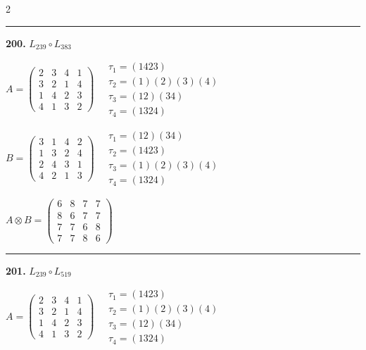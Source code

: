 \begin{multicols}{2}
\vspace{0.3em}
\hrule
\vspace{0.3em}

\noindent\textbf{200.} $L_{239} \circ L_{383}$

$A = \begin{pmatrix} 2 & 3 & 4 & 1 \\ 3 & 2 & 1 & 4 \\ 1 & 4 & 2 & 3 \\ 4 & 1 & 3 & 2 \end{pmatrix} \quad \begin{matrix} \tau_{1}=(1 4 2 3) \\ \tau_{2}=(1)(2)(3)(4) \\ \tau_{3}=(1 2)(3 4) \\ \tau_{4}=(1 3 2 4) \end{matrix}$

$B = \begin{pmatrix} 3 & 1 & 4 & 2 \\ 1 & 3 & 2 & 4 \\ 2 & 4 & 3 & 1 \\ 4 & 2 & 1 & 3 \end{pmatrix} \quad \begin{matrix} \tau_{1}=(1 2)(3 4) \\ \tau_{2}=(1 4 2 3) \\ \tau_{3}=(1)(2)(3)(4) \\ \tau_{4}=(1 3 2 4) \end{matrix}$

$A \otimes B = \begin{pmatrix} 6 & 8 & 7 & 7 \\ 8 & 6 & 7 & 7 \\ 7 & 7 & 6 & 8 \\ 7 & 7 & 8 & 6 \end{pmatrix}$

\vspace{0.3em}
\hrule
\vspace{0.3em}

\noindent\textbf{201.} $L_{239} \circ L_{519}$

$A = \begin{pmatrix} 2 & 3 & 4 & 1 \\ 3 & 2 & 1 & 4 \\ 1 & 4 & 2 & 3 \\ 4 & 1 & 3 & 2 \end{pmatrix} \quad \begin{matrix} \tau_{1}=(1 4 2 3) \\ \tau_{2}=(1)(2)(3)(4) \\ \tau_{3}=(1 2)(3 4) \\ \tau_{4}=(1 3 2 4) \end{matrix}$


\end{multicols}

